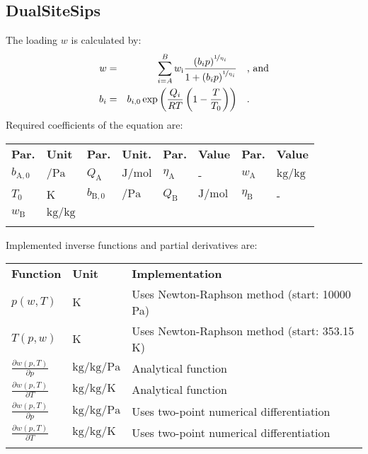 \subsection{DualSiteSips}
\label{cha:approaches:ads:sur:dss}
%
The loading $w$ is calculated by:
%
\begin{equation*}
	\begin{split}
		w &=& \sum_{i=A}^{B} w_\mathrm{i} \frac{\left( b_i p \right) ^ {\nicefrac{1}{\eta_i}} }{1 + \left( b_i p \right) ^ {\nicefrac{1}{\eta_i}}} & \quad\text{, and} \\
		b_i &=& b_{i,0} \exp \left( \frac{Q_i}{R T} \left( 1 - \frac{T}{T_0} \right) \right) & \quad\text{.}
	\end{split}
\end{equation*}
%
Required coefficients of the equation are:
%
\begin{longtable}[l]{ll|ll|ll|ll}
\toprule
\addlinespace
\textbf{Par.} & \textbf{Unit} & \textbf{Par.} &	\textbf{Unit.} & \textbf{Par.} & \textbf{Value} & \textbf{Par.} & \textbf{Value} \\
\addlinespace
\midrule
\endhead

\bottomrule
\endfoot
\bottomrule
\endlastfoot
\addlinespace

$b_\mathrm{A,0}$ & $\si{\per\pascal}$ & $Q_\mathrm{A}$ & $\si{\joule\per\mole}$ & $\eta_\mathrm{A}$ & - & $w_\mathrm{A}$ & $\si{\kilogram\per\kilogram}$ \\ 
$T_0$ & $\si{\kelvin}$ & $b_\mathrm{B,0}$ & $\si{\per\pascal}$ & $Q_\mathrm{B}$ & $\si{\joule\per\mole}$ & $\eta_\mathrm{B}$ & -  \\
$w_\mathrm{B}$ & $\si{\kilogram\per\kilogram}$ & & & & & & \\ 

\addlinespace
\end{longtable}
%
Implemented inverse functions and partial derivatives are:
%
\begin{longtable}[l]{l|l|p{7.5cm}}
	\toprule
	\addlinespace
	\textbf{Function} & \textbf{Unit} &	\textbf{Implementation} \\
	\addlinespace
	\midrule
	\endhead
	
	\bottomrule
	\endfoot
	\bottomrule
	\endlastfoot
	\addlinespace
	
	$p(w,T)$	& $\si{\kelvin}$ & Uses Newton-Raphson method (start: 10000 Pa) \\
	$T(p,w)$	& $\si{\kelvin}$ & Uses Newton-Raphson method (start: 353.15 K) \\
	$\frac{\partial w(p,T)}{\partial p}$	& $\si{\kilogram\per\kilogram\per\pascal}$ & Analytical function\\
	$\frac{\partial w(p,T)}{\partial T}$	& $\si{\kilogram\per\kilogram\per\kelvin}$ & Analytical function\\
	$\frac{\partial w(p,T)}{\partial p}$	& $\si{\kilogram\per\kilogram\per\pascal}$ & Uses two-point numerical differentiation\\
	$\frac{\partial w(p,T)}{\partial T}$	& $\si{\kilogram\per\kilogram\per\kelvin}$ & Uses two-point numerical differentiation\\
	
	\addlinespace
\end{longtable}
